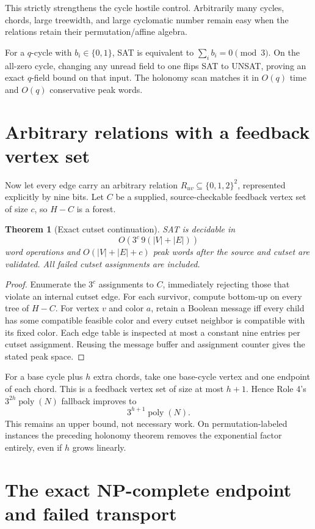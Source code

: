 \documentclass[11pt]{article}
\newtheorem{theorem}{Theorem}
\begin{document}
This strictly strengthens the cycle hostile control.  Arbitrarily many
cycles, chords, large treewidth, and large cyclomatic number remain easy when
the relations retain their permutation/affine algebra.

For a $q$-cycle with $b_i\in\{0,1\}$, SAT is equivalent to
$\sum_i b_i=0\pmod3$.  On the all-zero cycle, changing any unread field to
one flips SAT to UNSAT, proving an exact $q$-field bound on that input.  The
holonomy scan matches it in $O(q)$ time and $O(q)$ conservative peak words.

\section{Arbitrary relations with a feedback vertex set}

Now let every edge carry an arbitrary relation
$R_{uv}\subseteq\{0,1,2\}^2$, represented explicitly by nine bits.  Let
$C$ be a supplied, source-checkable feedback vertex set of size $c$, so
$H-C$ is a forest.

\begin{theorem}[Exact cutset continuation]
SAT is decidable in
\[
O\!\left(3^c\,9(|V|+|E|)
\right)
\]
word operations and $O(|V|+|E|+c)$ peak words after the source and cutset are
validated.  All failed cutset assignments are included.
\end{theorem}
\begin{proof}
Enumerate the $3^c$ assignments to $C$, immediately rejecting those that
violate an internal cutset edge.  For each survivor, compute bottom-up on
every tree of $H-C$.  For vertex $v$ and color $a$, retain a Boolean message
iff every child has some compatible feasible color and every cutset neighbor
is compatible with its fixed color.  Each edge table is inspected at most a
constant nine entries per cutset assignment.  Reusing the message buffer and
assignment counter gives the stated peak space.
\end{proof}

For a base cycle plus $h$ extra chords, take one base-cycle vertex and one
endpoint of each chord.  This is a feedback vertex set of size at most
$h+1$.  Hence Role 4's $3^{2h}\operatorname{poly}(N)$ fallback improves to
\[
3^{h+1}\operatorname{poly}(N).
\]
This remains an upper bound, not necessary work.  On permutation-labeled
instances the preceding holonomy theorem removes the exponential factor
entirely, even if $h$ grows linearly.

\section{The exact NP-complete endpoint and failed transport}
\end{document}
